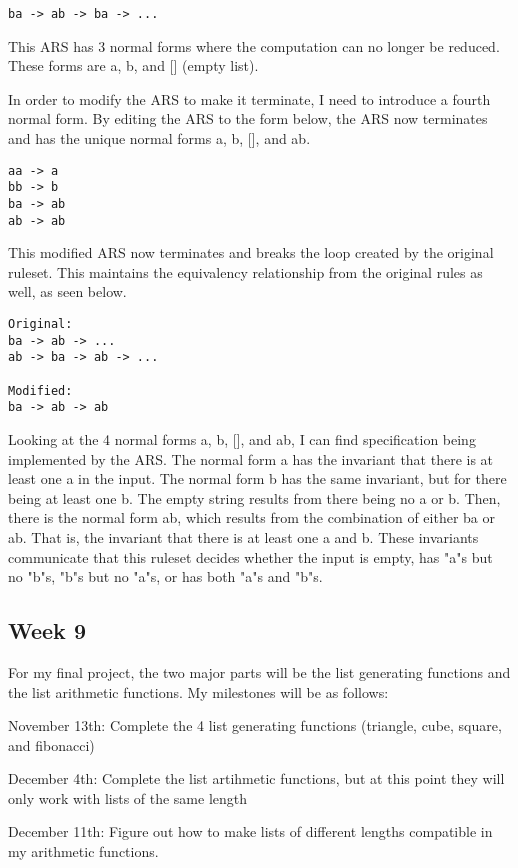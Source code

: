 \documentclass{article}
\theoremstyle{theorem}
\theoremstyle{definition}
\theoremstyle{remark}
\begin{document}
\begin{lstlisting}
ba -> ab -> ba -> ...
\end{lstlisting}
%
This ARS has 3 normal forms where the computation can no longer be reduced. These forms are a, b, and [] (empty list).

\medskip\noindent
In order to modify the ARS to make it terminate, I need to introduce a fourth normal form. By editing the ARS to the form below, the ARS now terminates and has the unique normal forms a, b, [], and ab.

\begin{lstlisting}
aa -> a
bb -> b
ba -> ab
ab -> ab
\end{lstlisting}
%
This modified ARS now terminates and breaks the loop created by the original ruleset. This maintains the equivalency relationship from the original rules as well, as seen below.

\begin{lstlisting}
Original:
ba -> ab -> ...
ab -> ba -> ab -> ...

Modified:
ba -> ab -> ab
\end{lstlisting}
%
Looking at the 4 normal forms a, b, [], and ab, I can find specification being implemented by the ARS. The normal form a has the invariant that there is at least one a in the input. The normal form b has the same invariant, but for there being at least one b. The empty string results from there being no a or b. Then, there is the normal form ab, which results from the combination of either ba or ab. That is, the invariant that there is at least one a and b. These invariants communicate that this ruleset decides whether the input is empty, has "a"s but no "b"s, "b"s but no "a"s, or has both "a"s and "b"s.

\subsection{Week 9}
For my final project, the two major parts will be the list generating functions and the list arithmetic functions. My milestones will be as follows:

\medskip\noindent
November 13th: Complete the 4 list generating functions (triangle, cube, square, and fibonacci)

\medskip\noindent
December 4th: Complete the list artihmetic functions, but at this point they will only work with lists of the same length

\medskip\noindent
December 11th: Figure out how to make lists of different lengths compatible in my arithmetic functions.
\end{document}

